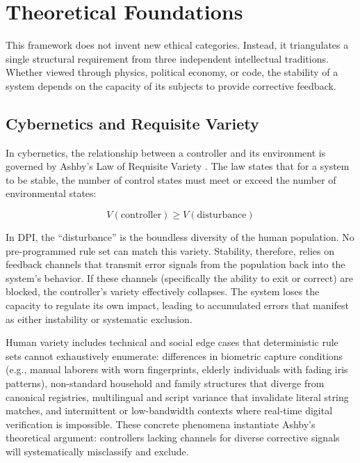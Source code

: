 \documentclass{article}
\begin{document}
\section{Theoretical Foundations}
\label{sec:theory}

This framework does not invent new ethical categories. Instead, it triangulates a single structural requirement from three independent intellectual traditions. Whether viewed through physics, political economy, or code, the stability of a system depends on the capacity of its subjects to provide corrective feedback.

\subsection{Cybernetics and Requisite Variety}

In cybernetics, the relationship between a controller and its environment is governed by Ashby's Law of Requisite Variety \citep{ashby1956}. The law states that for a system to be stable, the number of control states must meet or exceed the number of environmental states:

\begin{equation}
V(\text{controller}) \geq V(\text{disturbance})
\label{eq:ashby}
\end{equation}

In DPI, the ``disturbance'' is the boundless diversity of the human population. No pre-programmed rule set can match this variety. Stability, therefore, relies on feedback channels that transmit error signals from the population back into the system's behavior. If these channels (specifically the ability to exit or correct) are blocked, the controller's variety effectively collapses. The system loses the capacity to regulate its own impact, leading to accumulated errors that manifest as either instability or systematic exclusion.

Human variety includes technical and social edge cases that deterministic rule sets cannot exhaustively enumerate: differences in biometric capture conditions (e.g., manual laborers with worn fingerprints, elderly individuals with fading iris patterns), non-standard household and family structures that diverge from canonical registries, multilingual and script variance that invalidate literal string matches, and intermittent or low-bandwidth contexts where real-time digital verification is impossible. These concrete phenomena instantiate Ashby's theoretical argument: controllers lacking channels for diverse corrective signals will systematically misclassify and exclude.
\end{document}
